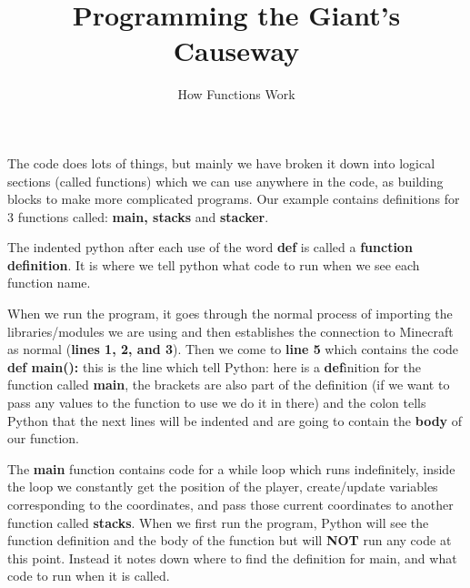 \documentclass{geocraft-worksheet-multipage}
\begin{document}
\title{Programming the Giant's Causeway}
\subtitle{How Functions Work}

\date{}
\maketitle


\lstset{language=Python}

\noindent%
%

%
%
\vspace{0.2cm}

The code does lots of things, but mainly we have broken it down into logical sections (called functions) which we can
use anywhere in the code, as building blocks to make more complicated programs. Our example contains definitions for 3
functions called: \textbf{main, stacks} and \textbf{stacker}. \vspace{0.5cm}


The indented python after each use of the word \textbf{def} is called a \textbf{function definition}. It is where we
tell python what code to run when we see each function name.  \vspace{0.5cm}


When we run the program, it goes through the normal process of importing the libraries/modules we are using and then
establishes the connection to Minecraft as normal (\textbf{lines 1, 2, and 3}). Then we come to \textbf{line 5} which
contains the code  \textbf{def main():} this is the line which tell Python: here is a \textbf{def}inition for the
function called \textbf{main}, the brackets are also part of the definition (if we want to pass any values to the
function to use we do it in there) and the colon tells Python that the next lines will be indented and are going to
contain the \textbf{body} of our function. \vspace{0.5cm}


The \textbf{main} function contains code for a while loop which runs indefinitely, inside the loop we constantly get the
position of the player, create/update variables corresponding to the coordinates, and pass those current coordinates to
another function called \textbf{stacks}. When we first run the program, Python will see the function definition and the
body of the function but will \textbf{NOT} run any code at this point. Instead it notes down where to find the
definition for main, and what code to run when it is called. \vspace{0.5cm}
\end{document}
